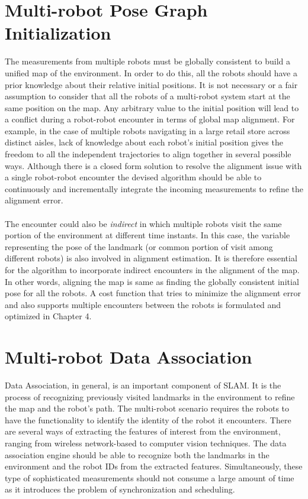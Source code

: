 \section{Multi-robot Pose Graph Initialization}
The measurements from multiple robots must be globally consistent to build a unified map of the environment. In order to do this, all the robots should have a prior knowledge about their relative initial positions. It is not necessary or a fair assumption to consider that all the robots of a multi-robot system start at the same position on the map. Any arbitrary value to the initial position will lead to a conflict during a robot-robot encounter in terms of global map alignment. For example, in the case of multiple robots navigating in a large retail store across distinct aisles, lack of knowledge about each robot's initial position gives the freedom to all the independent trajectories to align together in several possible ways. Although there is a closed form solution to resolve the alignment issue with a single robot-robot encounter \cite{zhoumulti} the devised algorithm should be able to continuously and incrementally integrate the incoming measurements to refine the alignment error. 

\paragraph{}
The encounter could also be \textit{indirect} in which multiple robots visit the same portion of the environment at different time instants. In this case, the variable representing the pose of the landmark (or common portion of visit among different robots) is also involved in alignment estimation. It is therefore essential for the algorithm to incorporate indirect encounters in the alignment of the map. In other words, aligning the map is same as finding the globally consistent initial pose for all the robots. A cost function that tries to minimize the alignment error and also supports multiple encounters between the robots is formulated and optimized in Chapter 4.

\section{Multi-robot Data Association}
Data Association, in general, is an important component of SLAM. It is the process of recognizing previously visited landmarks in the environment to refine the map and the robot's path. The multi-robot scenario requires the robots to have the functionality to identify the identity of the robot it encounters. There are several ways of extracting the features of interest from the environment, ranging from wireless network-based to computer vision techniques. The data association engine should be able to recognize both the landmarks in the environment and the robot IDs from the extracted features. Simultaneously, these type of sophisticated measurements should not consume a large amount of time as it introduces the problem of synchronization and scheduling.

